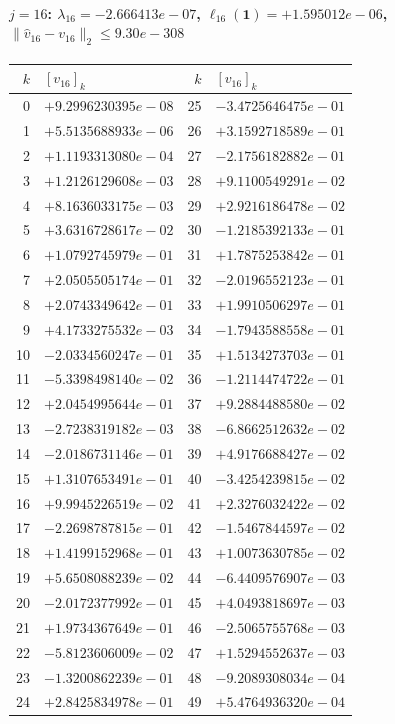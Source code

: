 \paragraph{$j = 16$: $\lambda_{16} = -2.666413e-07$, \quad $\ell_{16}(\mathbf{1}) = +1.595012e-06$, \quad $\|\hat{v}_{16} - v_{16}\|_2 \leq 9.30e-308$}
\begin{center}
{\footnotesize
\begin{tabular}{r@{\;\;}l@{\quad}r@{\;\;}l}
\toprule
$k$ & $[v_{16}]_k$ & $k$ & $[v_{16}]_k$ \\
\midrule
0 & $+9.2996230395e-08$ & 25 & $-3.4725646475e-01$ \\
1 & $+5.5135688933e-06$ & 26 & $+3.1592718589e-01$ \\
2 & $+1.1193313080e-04$ & 27 & $-2.1756182882e-01$ \\
3 & $+1.2126129608e-03$ & 28 & $+9.1100549291e-02$ \\
4 & $+8.1636033175e-03$ & 29 & $+2.9216186478e-02$ \\
5 & $+3.6316728617e-02$ & 30 & $-1.2185392133e-01$ \\
6 & $+1.0792745979e-01$ & 31 & $+1.7875253842e-01$ \\
7 & $+2.0505505174e-01$ & 32 & $-2.0196552123e-01$ \\
8 & $+2.0743349642e-01$ & 33 & $+1.9910506297e-01$ \\
9 & $+4.1733275532e-03$ & 34 & $-1.7943588558e-01$ \\
10 & $-2.0334560247e-01$ & 35 & $+1.5134273703e-01$ \\
11 & $-5.3398498140e-02$ & 36 & $-1.2114474722e-01$ \\
12 & $+2.0454995644e-01$ & 37 & $+9.2884488580e-02$ \\
13 & $-2.7238319182e-03$ & 38 & $-6.8662512632e-02$ \\
14 & $-2.0186731146e-01$ & 39 & $+4.9176688427e-02$ \\
15 & $+1.3107653491e-01$ & 40 & $-3.4254239815e-02$ \\
16 & $+9.9945226519e-02$ & 41 & $+2.3276032422e-02$ \\
17 & $-2.2698787815e-01$ & 42 & $-1.5467844597e-02$ \\
18 & $+1.4199152968e-01$ & 43 & $+1.0073630785e-02$ \\
19 & $+5.6508088239e-02$ & 44 & $-6.4409576907e-03$ \\
20 & $-2.0172377992e-01$ & 45 & $+4.0493818697e-03$ \\
21 & $+1.9734367649e-01$ & 46 & $-2.5065755768e-03$ \\
22 & $-5.8123606009e-02$ & 47 & $+1.5294552637e-03$ \\
23 & $-1.3200862239e-01$ & 48 & $-9.2089308034e-04$ \\
24 & $+2.8425834978e-01$ & 49 & $+5.4764936320e-04$ \\
\bottomrule
\end{tabular}
}
\end{center}

